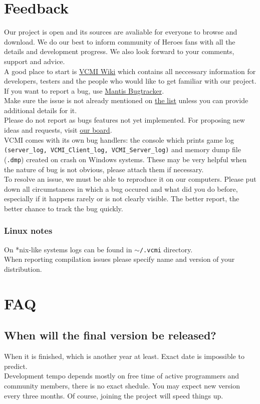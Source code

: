 \documentclass[a4size,final]{article}
\begin{document}
\section{Feedback}
Our project is open and its sources are avaliable for everyone to browse and download. We do our best to inform community of Heroes fans with all the details and development progress. We also look forward to your comments, support and advice.\medskip\\
A good place to start is \href{http://wiki.vcmi.eu/index.php?title=Main_Page}{VCMI Wiki} which contains all neccessary information for developers, testers and the people who would like to get familiar with our project.
If you want to report a bug, use \href{http://bugs.vcmi.eu/bug_report_advanced_page.php}{Mantis Bugtracker}.\\
Make sure the issue is not already mentioned on \href{http://bugs.vcmi.eu/view_all_bug_page.php}{the list} unless you can provide additional details for it.\\
Please do not report as bugs features not yet implemented. For proposing new ideas and requests, visit \href{http://forum.vcmi.eu/index.php}{our board}.\medskip\\
VCMI comes with its own bug handlers: the console which prints game log \texttt{(server\_log, VCMI\_Client\_log, VCMI\_Server\_log)} and memory dump file (\texttt{.dmp}) created on crash on Windows systems. These may be very helpful when the nature of bug is not obvious, please attach them if necessary.\medskip\\
To resolve an issue, we must be able to reproduce it on our computers. Please put down all circumstances in which a bug occured and what did you do before, especially if it happens rarely or is not clearly visible. The better report, the better chance to track the bug quickly.
\subsubsection{Linux notes}
On *nix-like systems logs can be found in \texttt{$\sim$/.vcmi} directory. \\
When reporting compilation issues please specify name and version of your distribution.
\section{FAQ}
\subsection{When will the final version be released?}
When it is finished, which is another year at least. Exact date is impossible to predict.\\
Development tempo depends mostly on free time of active programmers and community members, there is no exact shedule. You may expect new version every three months. Of course, joining the project will speed things up.
\end{document}
